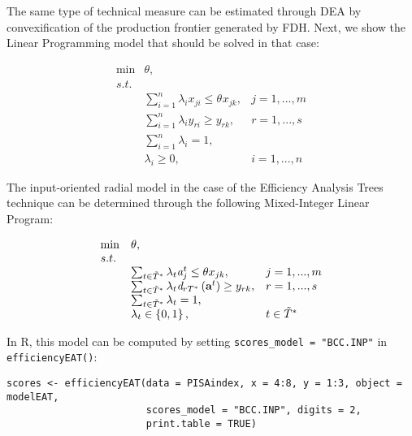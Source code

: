 The same type of technical measure can be estimated through DEA by convexification of the production frontier generated by FDH. Next, we show the Linear Programming model that should be solved in that case:

\begin{equation} \label{(16)} 
\begin{array}{lllll}  
{} & {\min } & {\theta, } & {} & {}  \\ 
{} & {s.t.} & {} & {} & {} \\ 
{} & {} & {\sum_{i=1}^{n}\lambda_{i} x_{ji}  \le \theta_{} x_{jk} ,} & {j=1,...,m} & {} \\ 
{} & {} & {\sum_{i=1}^{n}\lambda_{i} y_{ri}  \ge y_{rk} ,} & {r=1,...,s} & {} \\ 
{} & {} & {\sum_{i=1}^{n}\lambda_{i}  =1,} & {} & {} \\ 
{} & {} & {\lambda _{i} \ge 0,} & {i=1,...,n} & {} 
\end{array} 
\end{equation}

The input-oriented radial model in the case of the Efficiency Analysis Trees technique can be determined through the following Mixed-Integer Linear Program:

\begin{equation} \label{(17)} 
\begin{array}{lllll} 
{} & {\min } & {\theta,} & {} & {}  \\ 
{} & {s.t.} & {} & {} & {} \\ 
{} & {} & {\sum_{t\in \tilde{T}^{*} }^{}\lambda_{t} {\it a}_{j}^{t}  \le \theta x_{jk} ,} & {j=1,...,m} & {} \\ 
{} & {} & {\sum_{t\in \tilde{T}^{*} }^{}\lambda_{t} {\it d}_{rT^{*}} \left({\it \textbf{a}}^{t} \right) \ge y_{rk} ,} & {r=1,...,s} & {} \\ 
{} & {} & {\sum_{t\in \tilde{T}^{*} }^{}\lambda _{t}  =1,} & {} & {} \\ 
{} & {} & {\lambda _{t} \in \left\{0,1\right\},} & {t\in \tilde{T}^{*} } & {} 
\end{array} 
\end{equation}

In R, this model can be computed by setting \texttt{scores\_model\ =\ "BCC.INP"} in \texttt{efficiencyEAT()}:

\begin{verbatim}
scores <- efficiencyEAT(data = PISAindex, x = 4:8, y = 1:3, object = modelEAT, 
                        scores_model = "BCC.INP", digits = 2,
                        print.table = TRUE)
\end{verbatim}

